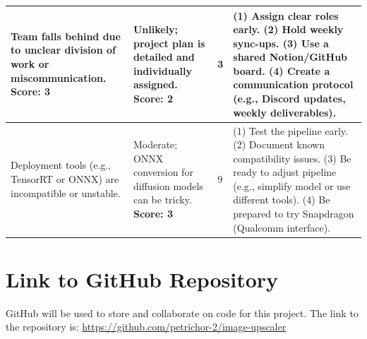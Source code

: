 \documentclass{article} %
\begin{document}
\begin{table}[h!]
\begin{tabularx}{\textwidth}{|>{\raggedright\arraybackslash}X|>{\raggedright\arraybackslash}X|>{\centering\arraybackslash}p{0.5cm}|>{\raggedright\arraybackslash}p{6cm}|}
Team falls behind due to unclear division of work or miscommunication. \textbf{Score: 3} &
Unlikely; project plan is detailed and individually assigned. \textbf{Score: 2} &
\cellcolor{risklow}3 &
(1) Assign clear roles early. (2) Hold weekly sync-ups. (3) Use a shared Notion/GitHub board. (4) Create a communication protocol (e.g., Discord updates, weekly deliverables). \\
\hline

Deployment tools (e.g., TensorRT or ONNX) are incompatible or unstable. &
Moderate; ONNX conversion for diffusion models can be tricky. \textbf{Score: 3} &
\cellcolor{riskmed}9 &
(1) Test the pipeline early. (2) Document known compatibility issues. (3) Be ready to adjust pipeline (e.g., simplify model or use different tools). (4) Be prepared to try Snapdragon (Qualcomm interface). \\
\hline
\end{tabularx}
\end{table}

\section{Link to GitHub Repository}

GitHub will be used to store and collaborate on code for this project. The link to the repository is: \url{https://github.com/petrichor-2/image-upscaler}

\clearpage

\label{last_page}



\end{document}
